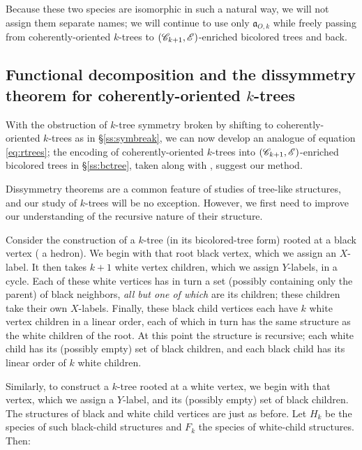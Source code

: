 \documentclass[sectionflow,singlespace,twoside]{brandiss} %
\numberwithin{section}{chapter}
\numberwithin{figure}{chapter}
\begin{document}
Because these two species are isomorphic in such a natural way, we will not assign them separate names; we will continue to use only $\mathfrak{a}_{O, k}$ while freely passing from coherently-oriented $k$-trees to $\left( {\mathscr{C}_{k+1}, \mathscr{E}} \right)$-enriched bicolored trees and back.

\subsection{Functional decomposition and the dissymmetry theorem for coherently-oriented $k$-trees}\label{ss:codecomp}
With the obstruction of $k$-tree symmetry broken by shifting to coherently-oriented $k$-trees as in \S \ref{ss:symbreak}, we can now develop an analogue of equation \eqref{eq:rtrees}; the encoding of coherently-oriented $k$-trees into $\left( {\mathscr{C}_{k+1}, \mathscr{E}} \right)$-enriched bicolored trees in \S \ref{ss:bctree}, taken along with \cite[\S 3.2]{bll:species}, suggest our method.

Dissymmetry theorems are a common feature of studies of tree-like structures, and our study of $k$-trees will be no exception.
However, we first need to improve our understanding of the recursive nature of their structure.

Consider the construction of a $k$-tree (in its bicolored-tree form) rooted at a black vertex ( a hedron).
We begin with that root black vertex, which we assign an $X$-label.
It then takes $k+1$ white vertex children, which we assign $Y$-labels, in a cycle.
Each of these white vertices has in turn a set (possibly containing only the parent) of black neighbors, \emph{all but one of which} are its children; these children take their own $X$-labels.
Finally, these black child vertices each have $k$ white vertex children in a linear order, each of which in turn has the same structure as the white children of the root.
At this point the structure is recursive; each white child has its (possibly empty) set of black children, and each black child has its linear order of $k$ white children.

Similarly, to construct a $k$-tree rooted at a white vertex, we begin with that vertex, which we assign a $Y$-label, and its (possibly empty) set of black children.
The structures of black and white child vertices are just as before.
Let $H_{k}$ be the species of such black-child structures and $F_{k}$ the species of white-child structures. Then:
\end{document}
